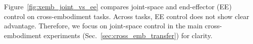  \label{app:xemb_joint_vs_ee}

Figure~\ref{fig:xemb_joint_vs_ee} compares joint-space and end-effector (EE) control on cross-embodiment tasks. Across tasks, EE control does not show clear advantage. Therefore, we focus on joint-space control in the main cross-embodiment experiments (Sec.~\ref{sec:cross_emb_transfer}) for clarity. 

